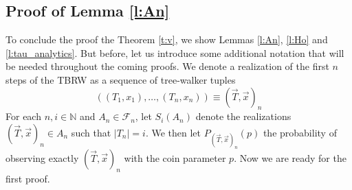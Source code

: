 \documentclass[a4paper]{amsart}
\begin{document}
\subsection{Proof of Lemma \ref{l:An}}To conclude the proof the Theorem \ref{t:v}, we show Lemmas \ref{l:An}, \ref{l:Ho} and \ref{l:tau_analytics}. But before, let us introduce some additional notation that will be needed throughout the coming proofs. We denote a realization of the first $n$ steps of the TBRW as a sequence of tree-walker tuples
\begin{equation}
((T_1,x_1), \dots, (T_n,x_n)) \equiv (\vec{T}, \vec{x})_n
\end{equation}
For each $n, i \in \mathbb{N}$ and $A_n \in \mathcal{F}_n$, let $S_{i}(A_n)$ denote the realizations $(\vec{T}, \vec{x})_n \in A_n$ such that $|T_n| = i$. 
We then let $P_{(\vec{T}, \vec{x})_n}(p)$ the probability of observing exactly $(\vec{T}, \vec{x})_n$ with the coin parameter $p$. Now we are ready for the first proof.
\end{document}
